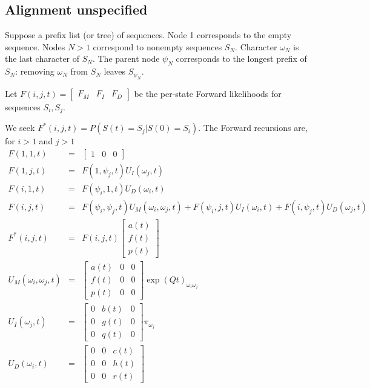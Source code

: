 \documentclass{article}
\begin{document}
\subsection{Alignment unspecified}

Suppose a prefix list (or tree) of sequences.
Node 1 corresponds to the empty sequence.
Nodes $N>1$ correspond to nonempty sequences $S_N$.
Character $\omega_N$ is the last character of $S_N$.
The parent node $\psi_N$ corresponds to the longest prefix of $S_N$:
removing $\omega_N$ from $S_N$ leaves $S_{\psi_N}$.

Let $F(i,j,t) = \begin{bmatrix} F_M & F_I & F_D \end{bmatrix}$
be the per-state Forward likelihoods for sequences $S_i,S_j$.

We seek $F^\ast(i,j,t) = P(S(t)=S_j|S(0)=S_i)$.
The Forward recursions are, for $i>1$ and $j>1$
\begin{eqnarray*}
F(1,1,t) & = & \begin{bmatrix} 1 & 0 & 0 \end{bmatrix}
\\
F(1,j,t) & = &
F(1,\psi_j,t) U_I(\omega_j,t)
\\
F(i,1,t) & = &
F(\psi_i,1,t) U_D(\omega_i,t)
\\
F(i,j,t) & = &
F(\psi_i,\psi_j,t) U_M(\omega_i,\omega_j,t)
+ F(\psi_i,j,t) U_I(\omega_i,t)
+ F(i,\psi_j,t) U_D(\omega_j,t)
\\
F^\ast(i,j,t) & = & F(i,j,t) \begin{bmatrix}
a(t) \\
f(t) \\
p(t) \end{bmatrix}
\\
U_M(\omega_i,\omega_j,t) & = &
\begin{bmatrix}
a(t) & 0 & 0 \\
f(t) & 0 & 0 \\
p(t) & 0 & 0 
\end{bmatrix}
\exp(Qt)_{\omega_i \omega_j}
\\
U_I(\omega_j,t) & = &
\begin{bmatrix}
0 & b(t) & 0 \\
0 & g(t) & 0 \\
0 & q(t) & 0 
\end{bmatrix}
\pi_{\omega_j}
\\
U_D(\omega_i,t) & = &
\begin{bmatrix}
0 & 0 & c(t) \\
0 & 0 & h(t) \\
0 & 0 & r(t) 
\end{bmatrix}
\end{eqnarray*}
\end{document}
